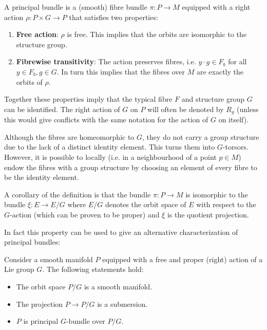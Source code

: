    \begin{definition}
        A principal bundle is a (smooth) fibre bundle $\pi:P\rightarrow M$ equipped with a right action $\rho:P\times G\rightarrow P$ that satisfies two properties:
        \begin{enumerate}
            \item \textbf{Free action}: $\rho$ is free. This implies that the orbits are isomorphic to the structure group.
            \item \textbf{Fibrewise transitivity}: The action preserves fibres, i.e. $y\cdot g\in F_b$ for all $y\in F_b, g\in G$. In turn this implies that the fibres over $M$ are exactly the orbits of $\rho$.
        \end{enumerate}
        Together these properties imply that the typical fibre $F$ and structure group $G$ can be identified. The right action of $G$ on $P$ will often be denoted by $R_g$ (unless this would give conflicts with the same notation for the action of $G$ on itself).
    \end{definition}
    \begin{remark}[$G$-torsor]\label{diff:fibre_torsor}
        Although the fibres are homeomorphic to $G$, they do not carry a group structure due to the lack of a distinct identity element. This turns them into $G$-torsors. However, it is possible to locally (i.e. in a neighbourhood of a point $p\in M$) endow the fibres with a group structure by choosing an element of every fibre to be the identity element.
    \end{remark}
    \begin{property}
        A corollary of the definition is that the bundle $\pi:P\rightarrow M$ is isomorphic to the bundle $\xi:E\rightarrow E/G$ where $E/G$ denotes the orbit space of $E$ with respect to the $G$-action (which can be proven to be proper) and $\xi$ is the quotient projection.
    \end{property}
    In fact this property can be used to give an alternative characterization of principal bundles:
    \begin{property}
        Consider a smooth manifold $P$ equipped with a free and proper (right) action of a Lie group $G$. The following statements hold:
        \begin{itemize}
            \item The orbit space $P/G$ is a smooth manifold.
            \item The projection $P\rightarrow P/G$ is a submersion.
            \item $P$ is principal $G$-bundle over $P/G$.
        \end{itemize}
    \end{property}

